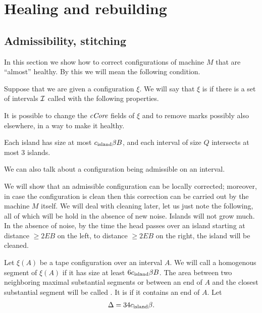 \documentclass[12pt]{memoir}
\renewcommand{\ge}{\geq}
\newcommand{\fld}[1]{\ensuremath{\textit{#1\/}}}
\def\B{B}
\newcommand{\E}{E}
\newcommand{\cCore}{\fld{cCore}}
\newcommand{\cns}[1]{c_{\textrm{\upshape #1}}}
\begin{document}
\section{Healing and rebuilding}\label{sec:healing}

\subsection{Admissibility, stitching}\label{sec:stitching}

In this section we show how to correct configurations of machine \( M \)
that are ``almost'' healthy.
By this we will mean the following condition.

\begin{definition}\label{def:admissible}
Suppose that we are given a configuration \( \xi \).
We will say that \( \xi \) is  if there is 
a set of intervals \( \mathcal{I} \) called  with the following properties.
\begin{alphenumIn}
 \item It is possible to change the \( \cCore \) fields of \( \xi \) and to
remove marks possibly also elsewhere, in a way to make it healthy.
 \item Each island has size at most \( \cns{island}\beta\B \), and
each interval of size \( Q \) intersects at most 3 islands.
\end{alphenumIn}
We can also talk about a configuration being admissible on an interval.  
\end{definition}

We will show that an admissible configuration can be locally corrected;
moreover, in case the configuration is clean then this correction
can be carried out by the machine \( M \) itself.
We will deal with cleaning later, let us just note the following, all of which
will be hold in the absence of new noise.
Islands will not grow much.
In the absence of noise, 
by the time the head passes over an island starting at distance \( \ge 2\E\B \)
on the left, to distance \( \ge 2\E\B \) on the right, the island
will be cleaned.

\begin{definition}\label{def:substantial}
Let \( \xi(A) \) be a tape configuration over an interval \( A \).
We will call a homogenous segment of \( \xi(A) \)  if it has size 
at least \( 6\cns{island}\beta\B \).
The area between two neighboring maximal
substantial segments or between an end of \( A \) and the closest substantial segment
will be called .
It is  if it contains an end of \( A \).
  Let
 \begin{align*}
 \Delta = 34\cns{island}\beta. %
 \end{align*}
\end{definition}
\end{document}

